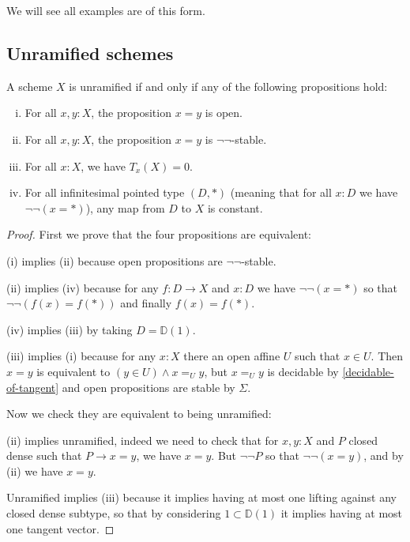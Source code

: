 We will see all examples are of this form.

\subsection{Unramified schemes}

\begin{proposition}\label{characterisation-unramified-schemes}
A scheme $X$ is unramified if and only if any of the following propositions hold:
  \begin{enumerate}[(i)]
  \item For all $x,y:X$, the proposition $x=y$ is open.
  \item For all $x,y:X$, the proposition $x=y$ is $\neg\neg$-stable.
  \item For all $x:X$, we have $T_x(X)=0$.
  \item For all infinitesimal pointed type $(D,*)$ (meaning that for all $x:D$ we have $\neg\neg(x=*)$), any map from $D$ to $X$ is constant.
  \end{enumerate}
\end{proposition}

\begin{proof}
First we prove that the four propositions are equivalent:

(i) implies (ii) because open propositions are $\neg\neg$-stable.

(ii) implies (iv) because for any $f:D\to X$ and $x:D$ we have $\neg\neg(x=*)$ so that $\neg\neg(f(x)=f(*))$ and finally $f(x)=f(*)$.

(iv) implies (iii) by taking $D=\mathbb{D}(1)$.

(iii) implies (i) because for any $x:X$ there an open affine $U$ such that $x\in U$. Then $x=y$ is equivalent to $(y\in U)\land x=_U y$, but $x=_Uy$ is decidable by \cref{decidable-of-tangent} and open propositions are stable by $\Sigma$.

Now we check they are equivalent to being unramified:

(ii) implies unramified, indeed we need to check that for $x,y:X$ and $P$ closed dense such that $P\to x=y$, we have $x=y$. But $\neg\neg P$ so that $\neg\neg(x=y)$, and by (ii) we have $x=y$.

Unramified implies (iii) because it implies having at most one lifting against any closed dense subtype, so that by considering $1\subset \mathbb{D}(1)$ it implies having at most one tangent vector.
\end{proof}

